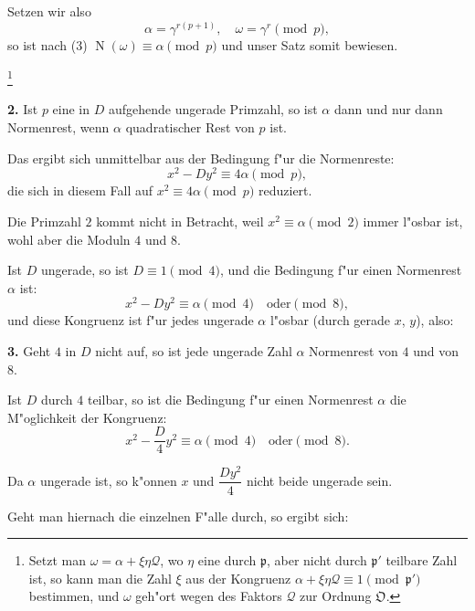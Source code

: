 \documentclass[11pt,a4paper]{article}
\theoremstyle{plain}
\DeclareMathOperator{\Norm}{N}
\begin{document}
Setzen wir also
\begin{equation}
\label{eq:108_4}
\alpha = \gamma^{r(p+1)}, \quad \omega = \gamma^r \pmod{p},
\end{equation}
so ist nach (3) $\Norm(\omega) \equiv \alpha \pmod{p}$ und unser Satz somit bewiesen.

\footnote{Setzt man $\omega = \alpha + \xi\eta\mathcal{Q}$, wo $\eta$ eine durch $\mathfrak{p}$, aber nicht durch $\mathfrak{p}'$ teilbare Zahl ist, so kann man die Zahl $\xi$ aus der Kongruenz $\alpha + \xi\eta\mathcal{Q} \equiv 1 \pmod{\mathfrak{p}'}$ bestimmen, und $\omega$ geh"{o}rt wegen des Faktors $\mathcal{Q}$ zur Ordnung $\mathfrak{O}$.}

\newpage
\setcounter{page}{392}

\textbf{2.} Ist $p$ eine in $D$ aufgehende ungerade Primzahl, so ist $\alpha$ dann und nur dann Normenrest, wenn $\alpha$ quadratischer Rest von $p$ ist.

Das ergibt sich unmittelbar aus der Bedingung f"{u}r die Normenreste:
\begin{equation}
\label{eq:108_5}
x^2 - Dy^2 \equiv 4\alpha \pmod{p},
\end{equation}
die sich in diesem Fall auf $x^2 \equiv 4\alpha \pmod{p}$ reduziert.

Die Primzahl $2$ kommt nicht in Betracht, weil $x^2 \equiv \alpha \pmod{2}$ immer l"{o}sbar ist, wohl aber die Moduln $4$ und $8$.

Ist $D$ ungerade, so ist $D \equiv 1 \pmod{4}$, und die Bedingung f"{u}r einen Normenrest $\alpha$ ist:
\[
x^2 - Dy^2 \equiv \alpha \pmod{4} \quad \text{oder} \pmod{8},
\]
und diese Kongruenz ist f"{u}r jedes ungerade $\alpha$ l"{o}sbar (durch gerade $x$, $y$), also:

\smallskip

\textbf{3.} Geht $4$ in $D$ nicht auf, so ist jede ungerade Zahl $\alpha$ Normenrest von $4$ und von $8$.

Ist $D$ durch $4$ teilbar, so ist die Bedingung f"{u}r einen Normenrest $\alpha$ die M"{o}glichkeit der Kongruenz:
\begin{equation}
\label{eq:108_6}
x^2 - \frac{D}{4}y^2 \equiv \alpha \pmod{4} \quad \text{oder} \pmod{8}.
\end{equation}

Da $\alpha$ ungerade ist, so k"{o}nnen $x$ und $\dfrac{Dy^2}{4}$ nicht beide ungerade sein.

Geht man hiernach die einzelnen F"{a}lle durch, so ergibt sich:
\end{document}
